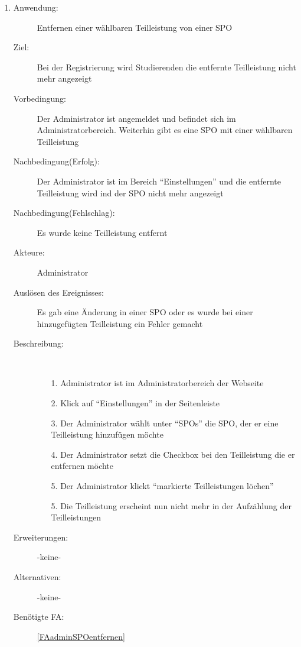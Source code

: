 \documentclass[parskip=full]{scrartcl}
\newcommand{\swtLabel}[1]{\textbf{/#1\arabic*0/}}
\begin{document}
\begin{enumerate} [label=\swtLabel{A}]
  \item \label{UCadminSPOteilleistungRM}
    \begin{description}
    \item[Anwendung:] Entfernen einer wählbaren \gls{Teilleistung} von einer
    \gls{SPO}
    \item[Ziel:] Bei der Registrierung wird Studierenden die entfernte
    Teilleistung nicht mehr angezeigt
    \item[Vorbedingung:] Der Administrator ist angemeldet und befindet sich im
    Administratorbereich. Weiterhin gibt es eine SPO mit einer wählbaren
    Teilleistung
    \item[Nachbedingung(Erfolg):] Der Administrator ist im Bereich
    \enquote{Einstellungen} und die entfernte Teilleistung wird ind der SPO
    nicht mehr angezeigt
    \item[Nachbedingung(Fehlschlag):] Es wurde keine Teilleistung entfernt
    \item[Akteure:] Administrator
    \item[Auslösen des Ereignisses:] Es gab eine Änderung in einer SPO oder es
    wurde bei einer hinzugefügten Teilleistung ein Fehler gemacht
    \item[Beschreibung:]~
    \begin{enumerate}
      \item[1.] Administrator ist im Administratorbereich der Webseite
      \item[2.] Klick auf \enquote{Einstellungen} in der Seitenleiste
       \item[3.] Der Administrator wählt unter \enquote{SPOs} die SPO, der er
       eine Teilleistung hinzufügen möchte
      \item[4.] Der Administrator setzt die Checkbox bei den Teilleistung die er
      entfernen möchte
      \item[5.] Der Administrator klickt \enquote{markierte Teilleistungen
      löchen}
      \item[5.] Die Teilleistung erscheint nun nicht mehr in der Aufzählung der
      Teilleistungen 
    \end{enumerate}
    \item[Erweiterungen:] -keine-
    \item[Alternativen:] -keine-
    \item[Benötigte FA:] \ref{FAadminSPOentfernen}
  \end{description}
  

\end{enumerate}
\end{document}
